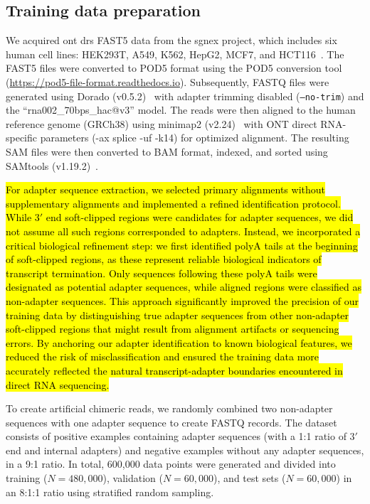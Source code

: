 \documentclass[pdflatex,sn-nature, lineno]{sn-jnl}%
\begin{document}
\subsection{Training data preparation}\label{ssec:data}

We acquired \gls{ont} \gls{drs} FAST5 data from the \gls{sgnex} project, which includes six human cell lines: HEK293T, A549, K562, HepG2, MCF7, and HCT116~\cite{chen2021systematic}.
The FAST5 files were converted to POD5 format using the POD5 conversion tool (\url{https://pod5-file-format.readthedocs.io}).
Subsequently, FASTQ files were generated using Dorado (v0.5.2)~\cite{dorado2023} with adapter trimming disabled (\texttt{--no-trim}) and the ``rna002\_70bps\_hac@v3'' model.
The reads were then aligned to the human reference genome (GRCh38) using minimap2 (v2.24)~\cite{li2018minimap2} with ONT direct RNA-specific parameters (-ax splice -uf -k14) for optimized alignment. The resulting SAM files were then converted to BAM format, indexed, and sorted using SAMtools (v1.19.2)~\cite{li2009sequence}.

\hl{For adapter sequence extraction, we selected primary alignments without supplementary alignments and implemented a refined identification protocol. While $3'$ end soft-clipped regions were candidates for adapter sequences, we did not assume all such regions corresponded to adapters.
Instead, we incorporated a critical biological refinement step: we first identified polyA tails at the beginning of soft-clipped regions, as these represent reliable biological indicators of transcript termination.
Only sequences following these polyA tails were designated as potential adapter sequences, while aligned regions were classified as non-adapter sequences.
This approach significantly improved the precision of our training data by distinguishing true adapter sequences from other non-adapter soft-clipped regions that might result from alignment artifacts or sequencing errors.
By anchoring our adapter identification to known biological features, we reduced the risk of misclassification and ensured the training data more accurately reflected the natural transcript-adapter boundaries encountered in direct RNA sequencing.}

To create artificial chimeric reads, we randomly combined two non-adapter sequences with one adapter sequence to create FASTQ records.
The dataset consists of positive examples containing adapter sequences (with a 1:1 ratio of $3'$ end and internal adapters) and negative examples without any adapter sequences, in a 9:1 ratio.
In total, 600,000 data points were generated and divided into training ($N=480,000$), validation ($N=60,000$), and test sets ($N=60,000$) in an 8:1:1 ratio using stratified random sampling.
\end{document}
